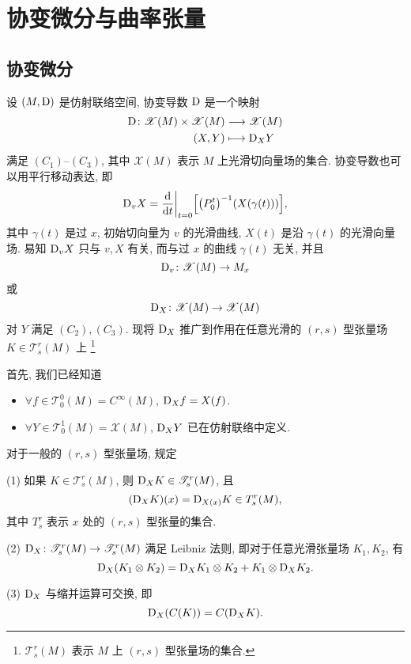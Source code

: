 \chapter{协变微分与曲率张量}



\section{协变微分}



设 $(M,\mathrm{D})$ 是仿射联络空间, 协变导数 $\mathrm{D}$ 是一个映射
\begin{align*}
  \mathrm{D}\colon \mathscr{X}(M)\times\mathscr{X}(M) & \longrightarrow\mathscr{X}(M) \\
  (X,Y) & \longmapsto \mathrm{D}_XY
\end{align*}
满足 $(C_1)$--$(C_3)$, 其中 $\mathscr{X}(M)$ 表示 $M$ 上光滑切向量场的集合.
协变导数也可以用平行移动表达, 即
\[\mathrm{D}_v X = \frac{\mathop{}\!\mathrm{d}}{\mathop{}\!\mathrm{d} t}\bigg|_{t=0} \Bigl[\bigl(P_0^t\bigr)^{-1} (X(\gamma(t)))\Bigr],\]
其中 $\gamma(t)$ 是过 $x$, 初始切向量为 $v$ 的光滑曲线, $X(t)$ 是沿 $\gamma(t)$
的光滑向量场. 易知 $\mathrm{D}_v X$ 只与 $v,X$ 有关, 而与过 $x$ 的曲线 $\gamma(t)$ 无关, 并且
\[\mathrm{D}_v\colon \mathscr{X}(M)\to M_x\]
或
\[\mathrm{D}_X\colon \mathscr{X}(M)\to\mathscr{X}(M)\]
对 $Y$ 满足 $(C_2),(C_3)$.
现将 $\mathrm{D}_X$ 推广到作用在任意光滑的 $(r,s)$ 型张量场 $K\in\mathscr{T}_s^r(M)$ 上
\footnote{$\mathscr{T}_s^r(M)$ 表示 $M$ 上 $(r,s)$ 型张量场的集合.}

首先, 我们已经知道
\begin{itemize}
  \item $\forall f\in\mathscr{T}_0^0(M)=C^{\infty}(M)$, $\mathrm{D}_X f = X(f)$.
  \item $\forall Y\in\mathscr{T}_0^1(M)=\mathscr{X}(M)$, $\mathrm{D}_XY$ 已在仿射联络中定义.
\end{itemize}

对于一般的 $(r,s)$ 型张量场, 规定

(1) 如果 $K\in\mathscr{T}_s^r(M)$, 则 $\mathrm{D}_XK\in\mathscr{T}_s^r(M)$, 且
\[(\mathrm{D}_XK)(x) = \mathrm{D}_{X(x)}K\in T_s^r(M),\]
其中 $T_s^r$ 表示 $x$ 处的 $(r,s)$ 型张量的集合.

(2) $\mathrm{D}_X\colon\mathscr{T}_s^r(M)\to\mathscr{T}_s^r(M)$ 满足 Leibniz 法则,
即对于任意光滑张量场 $K_1,K_2$, 有
\[\mathrm{D}_X(K_1\otimes K_2) = \mathrm{D}_XK_1\otimes K_2 + K_1\otimes\mathrm{D}_XK_2.\]

(3) $\mathrm{D}_X$ 与缩并运算可交换, 即
\[\mathrm{D}_X(C(K)) = C(\mathrm{D}_XK).\]

